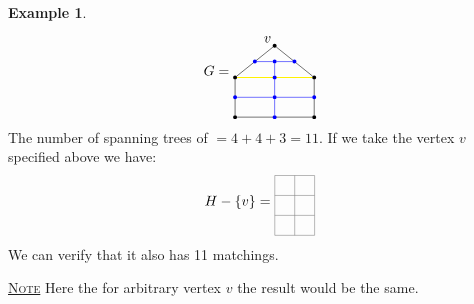 \documentclass{report}
\newcommand{\fancyem}[1]{\underline{\textsc{#1}}}
\theoremstyle{definition}
\newtheorem{example}{Example}[section]
\theoremstyle{remark}
\numberwithin{equation}{section}
\begin{document}
\begin{example}
    \[
        G = \begin{tikzpicture}[baseline=(current bounding box.center)]
            \node[shape=circle, fill=black, scale = 0.3] (A1) at (1, 1.8) {};
            \node[above left] at (A1.south east) {$v$};
            \node[shape=circle, fill=black, scale = 0.3] (A2) at (0, 0) {};
            \node[shape=circle, fill=black, scale = 0.3] (A3) at (2, 0) {};
            \node[shape=circle, fill=black, scale = 0.3] (A4) at (2, 1) {};
            \node[shape=circle, fill=black, scale = 0.3] (A5) at (0, 1) {};

            \draw[] (A5) -- (A2) -- (A3) -- (A4) -- (A1) -- (A5);
            \draw[yellow, thick] (A4) -- (A5);

            \node[shape=circle, fill=blue, scale = 0.3] (A6) at (0.5, 1.4) {};
            \node[shape=circle, fill=blue, scale = 0.3] (A7) at (1.5, 1.4) {};
            \node[shape=circle, fill=blue, scale = 0.3] (A8) at (1, 1) {};
            \node[shape=circle, fill=blue, scale = 0.3] (A9) at (0, 0.5) {};
            \node[shape=circle, fill=blue, scale = 0.3] (A10) at (1, 0) {};
            \node[shape=circle, fill=blue, scale = 0.3] (A11) at (2, 0.5) {};
            \node[shape=circle, fill=blue, scale = 0.3] (A12) at (1, 1.4) {};
            \node[shape=circle, fill=blue, scale = 0.3] (A13) at (1, 0.5) {};

            \draw[blue] (A6) -- (A12) -- (A7);
            \draw[blue] (A12) -- (A8) -- (A13) -- (A10);
            \draw[blue] (A9) -- (A13) -- (A11);
            
        \end{tikzpicture}
    \]
    The number of spanning trees of $= 4 + 4 + 3 = 11$. If we take the vertex $v$ specified above we have:
    \[
        H - \{v\} = \begin{tikzpicture}[baseline=(current bounding box.center)]
            \draw[step = 0.5cm, gray, thin] (0, 0) grid (1, 1.5);
        \end{tikzpicture} 
    \]
    We can verify that it also has 11 matchings.

    \fancyem{Note} Here the for arbitrary vertex $v$ the result would be the same.
\end{example}
\end{document}
